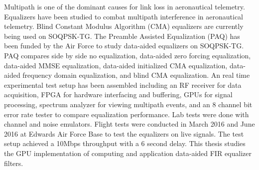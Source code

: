 Multipath is one of the dominant causes for link loss in aeronautical telemetry.
Equalizers have been studied to combat multipath interference in aeronautical telemetry.
Blind Constant Modulus Algorithm (CMA) equalizers are currently being used on SOQPSK-TG.
The Preamble Assisted Equalization (PAQ) has been funded by the Air Force to study data-aided equalizers on SOQPSK-TG.
PAQ compares side by side no equalization, data-aided zero forcing equalization, data-aided MMSE equalization, data-aided initialized CMA equalization, data-aided frequency domain equalization, and blind CMA equalization.
An real time experimental test setup has been assembled including an RF receiver for data acquisition, FPGA for hardware interfacing and buffering, GPUs for signal processing, spectrum analyzer for viewing multipath events, and an 8 channel bit error rate tester to compare equalization performance. 
Lab tests were done with channel and noise emulators.
Flight tests were conducted in March 2016 and June 2016 at Edwards Air Force Base to test the equalizers on live signals.
The test setup achieved a 10Mbps throughput with a 6 second delay.
This thesis studies the GPU implementation of computing and application data-aided FIR equalizer filters.
